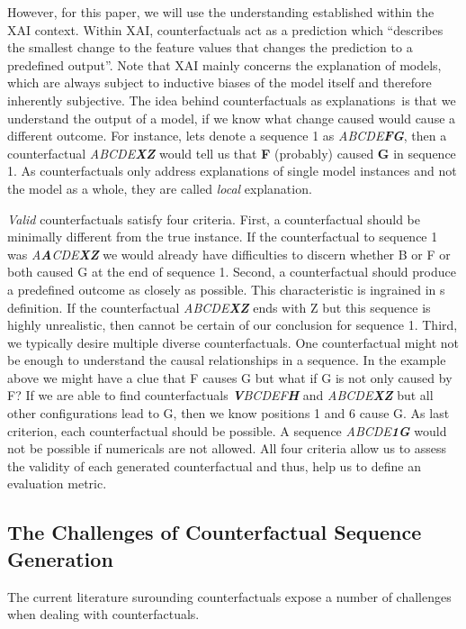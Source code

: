 \documentclass[12pt,a4paper]{report}
\begin{document}
However, for this paper, we will use the understanding established within the \gls{XAI} context. Within \gls{XAI}, counterfactuals act as a prediction which \enquote{describes the smallest change to the feature values that changes the prediction to a predefined output}\autocite{molnar2019}. Note that \gls{XAI} mainly concerns the explanation of models, which are always subject to inductive biases of the model itself and therefore inherently subjective. The idea behind counterfactuals as explanations\footnotemark ~is that we understand the output of a model, if we know what change caused would cause a different outcome. For instance, lets denote a sequence 1 as \textit{ABCDE\textbf{FG}}, then a counterfactual \textit{ABCDE\textbf{XZ}} would tell us that \textbf{F} (probably) caused \textbf{G} in sequence 1. As counterfactuals only address explanations of single model instances and not the model as a whole, they are called \emph{local} explanation.

\emph{Valid} counterfactuals satisfy four criteria. First, a counterfactual should be minimally different from the true instance. If the counterfactual to sequence 1 was \textit{A\textbf{A}CDE\textbf{XZ}} we would already have difficulties to discern whether B or F or both caused G at the end of sequence 1. Second, a counterfactual should produce a predefined outcome as closely as possible. This characteristic is ingrained in \citeauthor{molnar2019}s definition. If the counterfactual \textit{ABCDE\textbf{XZ}} ends with Z but this sequence is highly unrealistic, then cannot be certain of our conclusion for sequence 1. Third, we typically desire multiple diverse counterfactuals.  One counterfactual might not be enough to understand the causal relationships in a sequence. In the example above we might have a clue that F causes G but what if G is not only caused by F? If we are able to find counterfactuals \textit{\textbf{V}BCDEF\textbf{H}} and \textit{ABCDE\textbf{XZ}} but all other configurations lead to G, then we know positions 1 and 6 cause G. As last criterion, each counterfactual should be possible. A sequence \textit{ABCDE\textbf{1G}} would not be possible if numericals are not allowed. All four criteria allow us to assess the validity of each generated counterfactual and thus, help us to define an evaluation metric.

\subsection{The Challenges of Counterfactual Sequence Generation}
The current literature surounding counterfactuals expose a number of challenges when dealing with counterfactuals.
\end{document}
